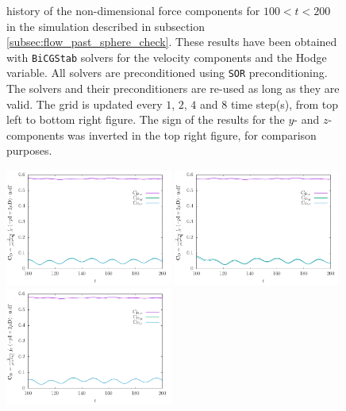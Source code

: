 \documentclass[11pt, a4paper]{article}
\theoremstyle{remark}
\begin{document}
\begin{figure}
 \caption{\label{fig:forces_flow_past_sphere_reused_solvers_bcgs_and_pcsor} history of the non-dimensional force components for $100 < t < 200$ in the simulation described in subsection \ref{subsec:flow_past_sphere_check}. These results have been obtained with \texttt{BiCGStab} solvers for the velocity components and the Hodge variable. All solvers are preconditioned using \texttt{SOR} preconditioning. The solvers and their preconditioners are re-used as long as they are valid. The grid is updated every $1$, $2$, $4$ and $8$ time step(s), from top left to bottom right figure. The sign of the results for the $y$- and $z$- components was inverted in the top right figure, for comparison purposes.} 
\end{figure}

\begin{figure}
  \centering
  \includegraphics[width=0.49\textwidth]{./results/flow_past_sphere_smoke/optimized_run_reused_solvers_cg_and_pchypre/grid_update_1/force_history.pdf}
  \includegraphics[width=0.49\textwidth]{./results/flow_past_sphere_smoke/optimized_run_reused_solvers_cg_and_pchypre/grid_update_2/force_history.pdf} \\
  \includegraphics[width=0.49\textwidth]{./results/flow_past_sphere_smoke/optimized_run_reused_solvers_cg_and_pchypre/grid_update_4/force_history.pdf} 

\end{figure}
\end{document}
